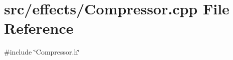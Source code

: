 \section{src/effects/\+Compressor.cpp File Reference}
\label{_compressor_8cpp}
{\ttfamily \#include \char`\"{}Compressor.\+h\char`\"{}}\newline
